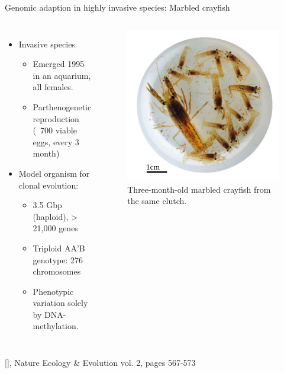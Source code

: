 \documentclass[10pt]{beamer}
\newcommand{\credit}[1]{{\vspace{\fill} \par \raggedleft \scriptsize \mdseries \color{mDarkBrown} #1 \par}}
\newcommand{\citeme}[1]{{\xspace\color{scAqua} \scriptsize [\cite{#1}]}}
\begin{document}
\begin{frame}{Genomic adaption in highly invasive species: Marbled crayfish}
\begin{columns}
	\begin{itemize}
		\item Invasive species 
		\begin{itemize}
			\item Emerged 1995 in an aquarium, all females.
			\item Parthenogenetic reproduction \linebreak (~700 viable eggs, every 3 month)
		\end{itemize}
		\item Model organism for clonal evolution:
		\begin{itemize}
			\item 3.5 Gbp (haploid), >​21,000 genes
			\item Triploid AA’B genotype: 276 chromosomes
			\item Phenotypic variation solely by DNA-methylation.
		\end{itemize}
	\end{itemize}
	\begin{figure}
		\includegraphics[width=\textwidth]{figures/marmorkrebs.png}
		\caption{Three-month-old marbled crayfish from the same clutch.}
	\end{figure}
\end{columns}
\credit{\citeme{Gutekunst2018}, Nature Ecology \& Evolution vol. 2, pages 567-573}
\end{frame}
\end{document}
